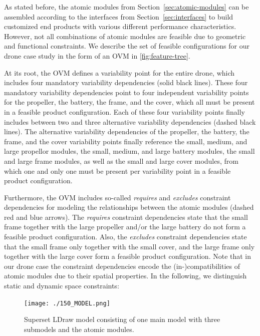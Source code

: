 \documentclass[sigconf,review]{acmart}
\begin{document}
As stated before, the atomic modules from Section~\ref{sec:atomic-modules} can be assembled according to the interfaces from Section~\ref{sec:interfaces} to build customized end products with various different performance characteristics.
However, not all combinations of atomic modules are feasible due to geometric and functional constraints.
We describe the set of feasible configurations for our drone case study in the form of an OVM in \cref{fig:feature-tree}.

At its root, the OVM defines a variability point for the entire drone, which includes four mandatory variability dependencies (solid black lines).
These four mandatory variability dependencies point to four independent variability points for the propeller, the battery, the frame, and the cover, which all must be present in a feasible product configuration.
Each of these four variability points finally includes between two and three alternative variability dependencies (dashed black lines).
The alternative variability dependencies of the propeller, the battery, the frame, and the cover variability points finally reference the small, medium, and large propellor modules, the small, medium, and large battery modules, the small and large frame modules, as well as the small and large cover modules, from which one and only one must be present per variability point in a feasible product configuration.

Furthermore, the OVM includes so-called \textit{requires} and \textit{excludes} constraint dependencies for modeling the relationships between the atomic modules (dashed red and blue arrows).
The \textit{requires} constraint dependencies state that the small frame together with the large propeller and/or the large battery do not form a feasible product configuration.
Also, the \textit{excludes} constraint dependencies state that the small frame only together with the small cover, and the large frame only together with the large cover form a feasible product configuration.
Note that in our drone case the constraint dependencies encode the (in-)compatibilities of atomic modules due to their spatial properties.
In the following, we distinguish static and dynamic space constraints:

\begin{figure}[tbp]
    \texttt{[image: ./150\_MODEL.png]}
    \caption{Superset LDraw model consisting of one main model with three submodels and the atomic modules.}
    \label{fig:150-model}
\end{figure}
\end{document}
